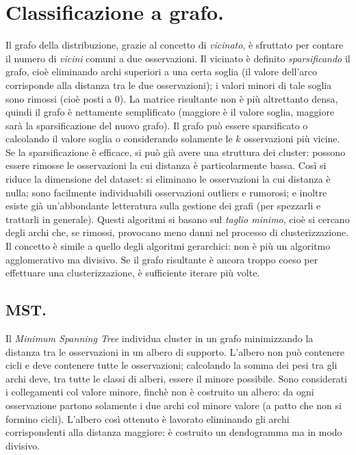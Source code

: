 \documentclass[11pt, a4page, twocolumn]{article}
\begin{document}
\section{Classificazione a grafo.}
Il grafo della distribuzione, grazie al concetto di \textit{vicinato}, è sfruttato per contare il numero di \textit{vicini} comuni a due osservazioni.
Il vicinato è definito \textit{sparsificando} il grafo, cioè eliminando archi superiori a una certa soglia (il valore dell'arco corrisponde alla distanza tra le due osservazioni); i valori minori di tale soglia sono rimossi (cioè posti a 0).
La matrice risultante non è più altrettanto densa, quindi il grafo è nettamente semplificato (maggiore è il valore soglia, maggiore sarà la sparsificazione del nuovo grafo). \newline
Il grafo può essere sparsificato o calcolando il valore soglia o considerando solamente le $k$ osservazioni più vicine.
Se la sparsificazione è efficace, si può già avere una struttura dei cluster: possono essere rimosse le osservazioni la cui distanza è particolarmente bassa.
Così si riduce la dimensione del dataset: si eliminano le osservazioni la cui distanza è nulla; sono facilmente individuabili osservazioni outliers e rumorosi; e inoltre esiste già un'abbondante letteratura sulla gestione dei grafi (per spezzarli e trattarli in generale).
Questi algoritmi si basano sul \textit{taglio minimo}, cioè si cercano degli archi che, se rimossi, provocano meno danni nel processo di clusterizzazione.
Il concetto è simile a quello degli algoritmi gerarchici: non è più un algoritmo agglomerativo ma divisivo.
Se il grafo risultante è ancora troppo coeso per effettuare una clusterizzazione, è sufficiente iterare più volte. \newline

\subsection{MST.}
Il \textit{Minimum Spanning Tree} individua cluster in un grafo minimizzando la distanza tra le osservazioni in un albero di supporto.
L'albero non può contenere cicli e deve contenere tutte le osservazioni; calcolando la somma dei pesi tra gli archi deve, tra tutte le classi di alberi, essere il minore possibile.
Sono considerati i collegamenti col valore minore, finchè non è costruito un albero: da ogni osservazione partono solamente i due archi col minore valore (a patto che non si formino cicli).
L'albero così ottenuto è lavorato eliminando gli archi corrispondenti alla distanza maggiore: è costruito un dendogramma ma in modo divisivo.
\end{document}
